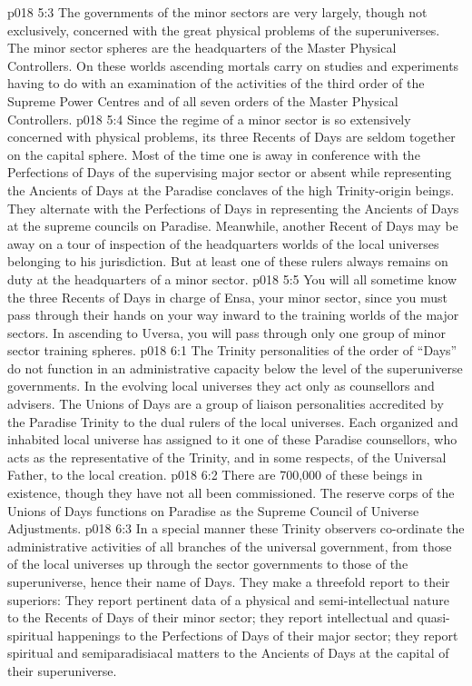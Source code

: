\vs p018 5:3 The governments of the minor sectors are very largely, though not exclusively, concerned with the great physical problems of the superuniverses. The minor sector spheres are the headquarters of the Master Physical Controllers. On these worlds ascending mortals carry on studies and experiments having to do with an examination of the activities of the third order of the Supreme Power Centres and of all seven orders of the Master Physical Controllers.
\vs p018 5:4 Since the regime of a minor sector is so extensively concerned with physical problems, its three Recents of Days are seldom together on the capital sphere. Most of the time one is away in conference with the Perfections of Days of the supervising major sector or absent while representing the Ancients of Days at the Paradise conclaves of the high Trinity\hyp{}origin beings. They alternate with the Perfections of Days in representing the Ancients of Days at the supreme councils on Paradise. Meanwhile, another Recent of Days may be away on a tour of inspection of the headquarters worlds of the local universes belonging to his jurisdiction. But at least one of these rulers always remains on duty at the headquarters of a minor sector.
\vs p018 5:5 You will all sometime know the three Recents of Days in charge of Ensa, your minor sector, since you must pass through their hands on your way inward to the training worlds of the major sectors. In ascending to Uversa, you will pass through only one group of minor sector training spheres.
\vs p018 6:1 The Trinity personalities of the order of “Days” do not function in an administrative capacity below the level of the superuniverse governments. In the evolving local universes they act only as counsellors and advisers. The Unions of Days are a group of liaison personalities accredited by the Paradise Trinity to the dual rulers of the local universes. Each organized and inhabited local universe has assigned to it one of these Paradise counsellors, who acts as the representative of the Trinity, and in some respects, of the Universal Father, to the local creation.
\vs p018 6:2 There are 700,000 of these beings in existence, though they have not all been commissioned. The reserve corps of the Unions of Days functions on Paradise as the Supreme Council of Universe Adjustments.
\vs p018 6:3 In a special manner these Trinity observers co\hyp{}ordinate the administrative activities of all branches of the universal government, from those of the local universes up through the sector governments to those of the superuniverse, hence their name  of Days. They make a threefold report to their superiors: They report pertinent data of a physical and semi\hyp{}intellectual nature to the Recents of Days of their minor sector; they report intellectual and quasi\hyp{}spiritual happenings to the Perfections of Days of their major sector; they report spiritual and semiparadisiacal matters to the Ancients of Days at the capital of their superuniverse.
